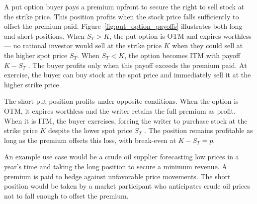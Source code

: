 \documentclass[english,12pt,a4paper,pdftex,sci,utf8]{aaltothesis}
\begin{document}
A put option buyer pays a premium upfront to secure the right to sell stock at the strike price. This position profits when the stock price falls sufficiently to offset the premium paid. Figure~\ref{fig:put_option_payoffs} illustrates both long and short positions. When $S_T > K$, the put option is OTM and expires worthless --- no rational investor would sell at the strike price $K$ when they could sell at the higher spot price $S_T$. When $S_T < K$, the option becomes ITM with payoff $K - S_T$ \cite{hull2013fundamentals}. The buyer profits only when this payoff exceeds the premium paid. At exercise, the buyer can buy stock at the spot price and immediately sell it at the higher strike price.

The short put position profits under opposite conditions. When the option is OTM, it expires worthless and the writer retains the full premium as profit. When it is ITM, the buyer exercises, forcing the writer to purchase stock at the strike price $K$ despite the lower spot price $S_T$ \cite{hull2013fundamentals}. The position remains profitable as long as the premium offsets this loss, with break-even at $K - S_T = p$.

An example use case would be a crude oil supplier forecasting low prices in a year's time and taking the long position to secure a minimum revenue. A premium is paid to hedge against unfavorable price movements. The short position would be taken by a market participant who anticipates crude oil prices not to fall enough to offset the premium.
\end{document}
